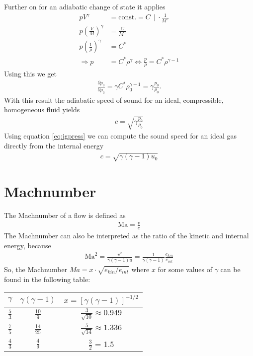 \documentclass[a4paper,
					12pt,
					twoside,
					pagesize,
					cleardoubleplain,
					headsepline,
					bibtotoc
					]{scrbook}
\newcommand{\lra}[1]{{ \left( #1 \right) }}
\newcommand{\lrb}[1]{{ \left[ #1 \right] }}
\begin{document}
Further on for an adiabatic change of state it applies
\begin{align}
p V^\gamma &= \text{const.} = C \ \ |\ \cdot\frac{1}{M^\gamma}\\
p \lra{\frac{V}{M}}^\gamma &= \frac{C}{M^\gamma}\\
p \lra{\frac{1}{\rho}}^\gamma &= C^*\\
\Longrightarrow 
p &= C^* \rho^\gamma \Longleftrightarrow \frac{p}{\rho} = C^* \rho^{\gamma-1}
\end{align}
Using this we get
\begin{align}
\frac{\partial p_0}{\partial \rho_0} = \gamma C^* \rho_0^{\gamma-1} 
= \gamma \frac{p_0}{\rho_0}.
\end{align}
With this result the adiabatic speed of sound for an ideal, compressible,
homogeneous fluid yields
\begin{align}
c=\sqrt{\gamma \frac{p_0}{\rho_0}}
\end{align}
Using equation \eqref{eq:igpress} we can compute the sound speed for an ideal gas 
directly from the internal energy
\begin{align}
c=\sqrt{\gamma (\gamma-1) u_0}
\end{align}
\section{Machnumber}
The Machnumber of a flow is defined as
\begin{align}
\text{Ma}=\frac{v}{c}
\end{align}
The Machnumber can also be interpreted as the ratio of the kinetic and internal 
energy, because
\begin{align}
\text{Ma}^2=\frac{v^2}{\gamma(\gamma-1) u}=\frac{1}{\gamma(\gamma-1)}\frac{e_{kin}}{e_{int}}
\end{align}
So, the Machnumber $Ma = x \cdot \sqrt{e_{kin}/e_{int}}$ where $x$ for some 
values of $\gamma$ can be found in the following table:  
\begin{center}
\begin{tabular}{ccc}
$\gamma$ & $\gamma(\gamma-1)$ & $x = \lrb{\gamma(\gamma-1)}^{-1/2}$ \\ 
\hline
\hline
$\frac{5}{3}$ & $\frac{10}{9}$ & $\frac{3}{\sqrt{10}}\approx 0.949$ \\  
$\frac{7}{5}$ & $\frac{14}{25}$ & $\frac{5}{\sqrt{14}}\approx 1.336$ \\  
$\frac{4}{3}$ & $\frac{4}{9}$ &  $\frac{3}{2}$ = 1.5\\ 
\hline 
\end{tabular}
\end{center} 
\end{document}

